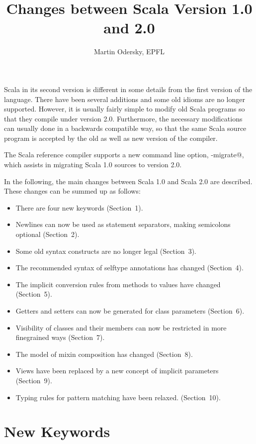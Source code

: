 \documentclass[a4paper,11pt,twoside]{article}
\title{Changes between Scala Version 1.0 and 2.0}
\author{Martin Odersky, EPFL}
\begin{document}
\sloppy
\maketitle

Scala in its second version is different in some details from the
first version of the language. There have been several additions and
some old idioms are no longer supported. However, it is usually fairly
simple to modify old Scala programs so that they compile under version
2.0. Furthermore, the necessary modifications can usually done in a
backwards compatible way, so that the same Scala source program is
accepted by the old as well as new version of the compiler.

The Scala reference compiler supports a new command line option,
\lstinline@-migrate@, which assists in migrating Scala 1.0
sources to version 2.0.

In the following, the main changes between Scala 1.0 and Scala 2.0 are
described. These changes can be summed up as follows:
\begin{itemize}
\item
There are four new keywords (Section~1).
\item
Newlines can now be used as statement separators, making semicolons
optional (Section~2).
\item 
Some old syntax constructs are no longer legal (Section~3).
\item
The recommended syntax of selftype annotations has changed
(Section~4).
\item
The implicit conversion rules from methods to values have changed
(Section~5).
\item
Getters and setters can now be generated for class parameters
(Section~6).
\item
Visibility of classes and their members can now be restricted in more
finegrained ways (Section~7).
\item
The model of mixin composition has changed (Section~8).
\item
Views have been replaced by a new concept of implicit parameters (Section~9).
\item
Typing rules for pattern matching have been relaxed. (Section~10).
\end{itemize}


\section{New Keywords}
\end{document}
